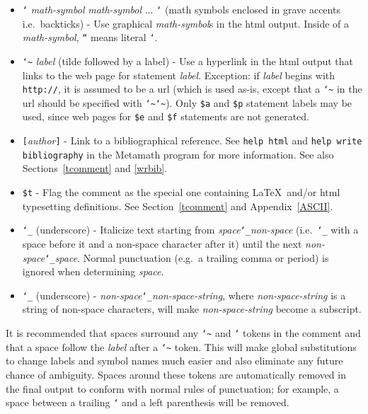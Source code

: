 \begin{itemize}
 \item[]
         \texttt{`} {\em math-symbol} {\em math-symbol} ... \texttt{`}
             (math symbols enclosed in grave accents i.e.\ backticks) -
             Use graphical {\em math-symbol}s
             in the {\sc html} output.
             Inside of a {\em math-symbol}, \texttt{``} means literal \texttt{`}.
 \item[]
         \texttt{\char`\~} {\em label} (tilde followed by a label)
             - Use  a hyperlink in the {\sc html} output
             that links to the web page for statement {\em label}.
             Exception:  if {\em label} begins with \texttt{http://},
             it is assumed to be
             a {\sc url} (which is used as-is, except that
             a \texttt{\char`\~} in the {\sc url} should
             be specified with \texttt{\char`\~}\texttt{\char`\~}).
             Only \texttt{\$a} and \texttt{\$p}
             statement labels may be used, since web pages for
             \texttt{\$e} and \texttt{\$f} statements are not generated.
 \item[]
         \texttt{[}{\em author}\texttt{]} - Link to a bibliographical reference. See
             \texttt{help html} and \texttt{help write
             bibliography} in the Metamath program for more
            information.\index{\texttt{\char`\[}\ldots\texttt{]} inside comments}
            See also Sections~\ref{tcomment} and \ref{wrbib}.
 \item[]
         \texttt{\$t} - Flag the comment as the special
             one
             containing \LaTeX\ and/or {\sc html} typesetting
             definitions.  See Section~\ref{tcomment} and Appendix~\ref{ASCII}.
 \item[]
         \texttt{\char`\_} (underscore) -
             Italicize text starting from
              {\em space}\texttt{\char`\_}{\em non-space} (i.e.\ \texttt{\char`\_}
              with a space before it and a non-space character after it) until
             the next
             {\em non-space}\texttt{\char`\_}{\em space}.  Normal
             punctuation (e.g.\ a trailing
             comma or period) is ignored when determining {\em space}.
 \item[]
         \texttt{\char`\_} (underscore) - {\em
         non-space}\texttt{\char`\_}{\em non-space-string}, where
          {\em non-space-string} is a string of non-space characters,
         will make {\em non-space-string} become a subscript.
\end{itemize}
It is recommended that spaces surround any \texttt{\char`\~} and \texttt{`} tokens
in the comment and that a space follow the {\em label} after a \texttt{\char`\~} token.
This will make global substitutions to change labels and symbol names much easier
and also eliminate any future chance of ambiguity.  Spaces
around these tokens are automatically removed in
the final output to conform with normal rules of punctuation; for example, a space
between a trailing \texttt{`} and a left parenthesis will be removed.

